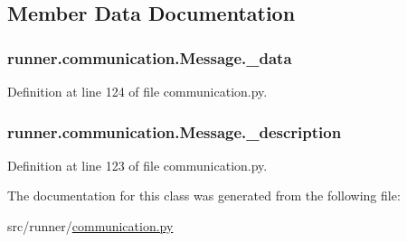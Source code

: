 \subsection{Member Data Documentation}
\hypertarget{classrunner_1_1communication_1_1Message_a8e585ae52598620f8677e297b4ec0717}{}
\subsubsection[{\+\_\+data}]{\setlength{\rightskip}{0pt plus 5cm}runner.\+communication.\+Message.\+\_\+data\hspace{0.3cm}{\ttfamily [private]}}\label{classrunner_1_1communication_1_1Message_a8e585ae52598620f8677e297b4ec0717}


Definition at line 124 of file communication.\+py.

\hypertarget{classrunner_1_1communication_1_1Message_a2d296c52f3bfc5e8a90dd9e3adffd3ab}{}
\subsubsection[{\+\_\+description}]{\setlength{\rightskip}{0pt plus 5cm}runner.\+communication.\+Message.\+\_\+description\hspace{0.3cm}{\ttfamily [private]}}\label{classrunner_1_1communication_1_1Message_a2d296c52f3bfc5e8a90dd9e3adffd3ab}


Definition at line 123 of file communication.\+py.



The documentation for this class was generated from the following file\+:\begin{DoxyCompactItemize}
\item 
src/runner/\hyperlink{communication_8py}{communication.\+py}\end{DoxyCompactItemize}
